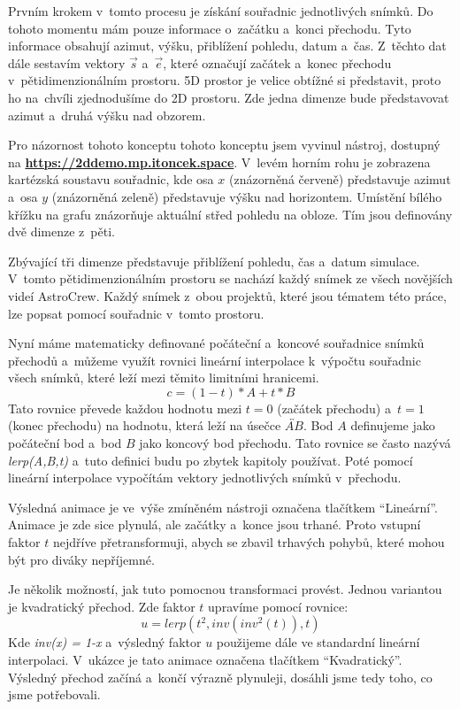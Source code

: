 \documentclass[12pt,a4paper,titlepage]{article}
\newcommand{\link}[2]{\href{#1}{\textcolor{link-color}{\textbf{#2}}}}%
\begin{document}
Prvním krokem v~tomto procesu je získání souřadnic jednotlivých snímků. Do tohoto momentu mám pouze informace o~začátku a~konci přechodu. Tyto informace obsahují azimut, výšku, přiblížení pohledu, datum a~čas. Z~těchto dat dále sestavím vektory $\vec{s}$ a~$\vec{e}$, které označují začátek a~konec přechodu v~pětidimenzionálním prostoru. 5D prostor je velice obtížné si představit, proto ho na~chvíli zjednodušíme do 2D prostoru. Zde jedna dimenze bude představovat azimut a~druhá výšku nad obzorem. 

Pro názornost tohoto konceptu tohoto konceptu jsem vyvinul nástroj, dostupný na \link{https://2ddemo.mp.itoncek.space}{https://2ddemo.mp.itoncek.space}. V~levém horním rohu je zobrazena kartézská soustavu souřadnic, kde osa $x$ (znázorněná červeně) představuje azimut a~osa $y$ (znázorněná zeleně) představuje výšku nad horizontem. Umístění bílého křížku na grafu znázorňuje aktuální střed pohledu na obloze. Tím jsou definovány dvě dimenze z~pěti.

Zbývající tři dimenze představuje přiblížení pohledu, čas a~datum simulace. V~tomto pětidimenzionálním prostoru se nachází každý snímek ze všech novějších videí AstroCrew. Každý snímek z~obou projektů, které jsou tématem této práce, lze popsat pomocí souřadnic v~tomto prostoru.

Nyní máme matematicky definované počáteční a~koncové souřadnice snímků přechodů a~můžeme využít rovnici lineární interpolace k~výpočtu souřadnic všech snímků, které leží mezi těmito limitními hranicemi.
\[c = (1-t)*A + t * B\] 
Tato rovnice převede každou hodnotu mezi $t=0$ (začátek přechodu) a~$t=1$ (konec přechodu) na hodnotu, která leží na úsečce $\overleftrightarrow{AB}$. Bod $A$ definujeme jako počáteční bod a~bod $B$ jako koncový bod přechodu. Tato rovnice se často nazývá \textit{lerp(A,B,t)} a~tuto definici budu po zbytek kapitoly používat. Poté pomocí lineární interpolace vypočítám vektory jednotlivých snímků v~přechodu.%

Výsledná animace je ve~výše zmíněném nástroji označena tlačítkem \enquote{Lineární}. Animace je zde sice plynulá, ale začátky a~konce jsou trhané. Proto vstupní faktor $t$ nejdříve přetransformuji, abych se zbavil trhavých pohybů, které mohou být pro diváky nepříjemné. 

Je několik možností, jak tuto pomocnou transformaci provést. Jednou variantou je kvadratický přechod. Zde faktor $t$ upravíme pomocí rovnice:
\[u = lerp({t}^{2}, inv({inv}^{2}(t)), t)\]
Kde \textit{inv(x) = 1-x} a~výsledný faktor $u$ použijeme dále ve standardní lineární interpolaci.  V~ukázce je tato animace označena tlačítkem \enquote{Kvadratický}. Výsledný přechod začíná a~končí výrazně plynuleji, dosáhli jsme tedy toho, co jsme potřebovali. %
\end{document}

